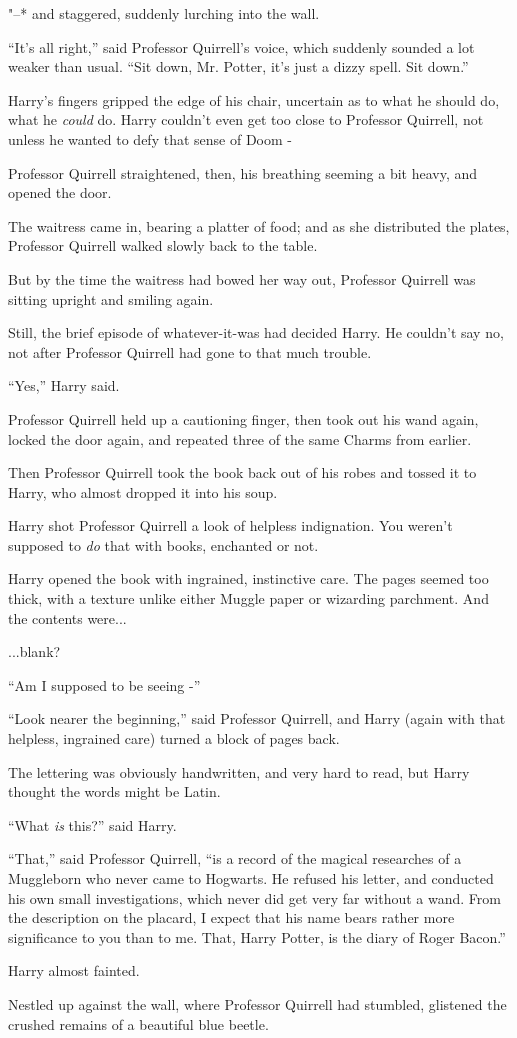 "--* and staggered, suddenly lurching into the wall.

``It's all right,'' said Professor Quirrell's voice, which suddenly
sounded a lot weaker than usual. ``Sit down, Mr. Potter, it's just a
dizzy spell. Sit down.''

Harry's fingers gripped the edge of his chair, uncertain as to what he
should do, what he \emph{could} do. Harry couldn't even get too close to
Professor Quirrell, not unless he wanted to defy that sense of Doom -

Professor Quirrell straightened, then, his breathing seeming a bit
heavy, and opened the door.

The waitress came in, bearing a platter of food; and as she distributed
the plates, Professor Quirrell walked slowly back to the table.

But by the time the waitress had bowed her way out, Professor Quirrell
was sitting upright and smiling again.

Still, the brief episode of whatever-it-was had decided Harry. He
couldn't say no, not after Professor Quirrell had gone to that much
trouble.

``Yes,'' Harry said.

Professor Quirrell held up a cautioning finger, then took out his wand
again, locked the door again, and repeated three of the same Charms from
earlier.

Then Professor Quirrell took the book back out of his robes and tossed
it to Harry, who almost dropped it into his soup.

Harry shot Professor Quirrell a look of helpless indignation. You
weren't supposed to \emph{do} that with books, enchanted or not.

Harry opened the book with ingrained, instinctive care. The pages seemed
too thick, with a texture unlike either Muggle paper or wizarding
parchment. And the contents were...

...blank?

``Am I supposed to be seeing -''

``Look nearer the beginning,'' said Professor Quirrell, and Harry (again
with that helpless, ingrained care) turned a block of pages back.

The lettering was obviously handwritten, and very hard to read, but
Harry thought the words might be Latin.

``What \emph{is} this?'' said Harry.

``That,'' said Professor Quirrell, ``is a record of the magical
researches of a Muggleborn who never came to Hogwarts. He refused his
letter, and conducted his own small investigations, which never did get
very far without a wand. From the description on the placard, I expect
that his name bears rather more significance to you than to me. That,
Harry Potter, is the diary of Roger Bacon.''

Harry almost fainted.

Nestled up against the wall, where Professor Quirrell had stumbled,
glistened the crushed remains of a beautiful blue beetle.
